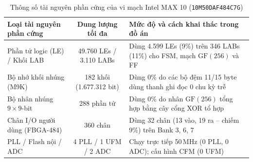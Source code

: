 \documentclass[11pt,a4paper]{report}
\begin{document}
\begin{table}[!htb]
    \centering
    \caption{Thông số tài nguyên phần cứng của vi mạch Intel MAX 10 (\texttt{10M50DAF484C7G})}
    \label{tab:max10-resources}
    \footnotesize
    \renewcommand{\arraystretch}{1.1}
    \begin{tabularx}{\textwidth}{l c X}
        \toprule
        \textbf{Loại tài nguyên phần cứng} & \textbf{Dung lượng tối đa} & \textbf{Mức độ và cách khai thác trong đồ án} \\
        \midrule
        Phần tử logic (LE) / Khối LAB & 49.760 LEs / 3.110 LABs & Dùng 4.599 LEs (9\%) trên 346 LABs (11\%) cho FSM, mạch $\text{GF}(256)$ và FF \\
        Bộ nhớ khối nhúng (M9K) & 182 khối (1.677.312 bit) & Dùng 0\% do các bộ đệm 11/15 byte dùng thanh ghi đọc 0 chu kỳ trễ \\
        Bộ nhân nhúng $9\times 9$-bit & 288 phần tử & Dùng 0\% do nhân $\text{GF}(256)$ tổng hợp bằng cây cổng XOR tổ hợp \\
        Chân I/O người dùng (FBGA-484) & 360 chân & Dùng 32 chân (13 vào, 19 ra -- chiếm 9\%) trên Bank 3, 6, 7 \\
        PLL / Flash nội / ADC & 4 PLL / 1 UFM / 2 ADC & Chạy trực tiếp 50\,MHz (0 PLL, 0 ADC); cấu hình CFM (0 UFM) \\
        \bottomrule
    \end{tabularx}
\end{table}
\end{document}
